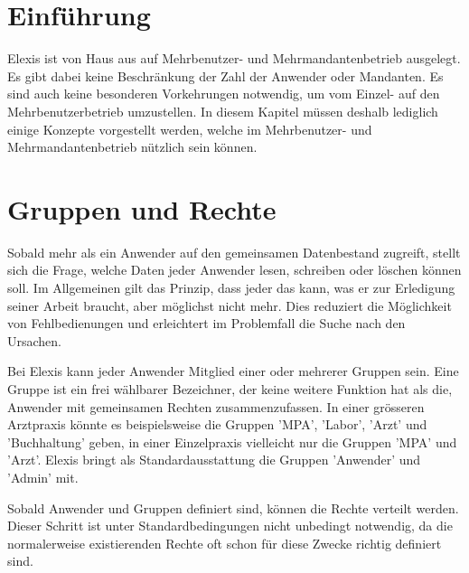 
\section{Einführung}
Elexis ist von Haus aus auf Mehrbenutzer- und Mehrmandantenbetrieb ausgelegt.
Es gibt dabei keine Beschränkung der Zahl der Anwender oder Mandanten. Es sind
auch keine besonderen Vorkehrungen notwendig, um vom Einzel- auf den
Mehrbenutzerbetrieb umzustellen. In diesem Kapitel müssen deshalb lediglich
einige Konzepte vorgestellt werden, welche im Mehrbenutzer- und
Mehrmandantenbetrieb nützlich sein können.

\section{Gruppen und Rechte}
\label{sec:gruppen}
Sobald mehr als ein Anwender auf den gemeinsamen Datenbestand zugreift, stellt
sich die Frage, welche Daten jeder Anwender lesen, schreiben oder löschen können
soll. Im Allgemeinen gilt das Prinzip, dass jeder das kann, was er
zur Erledigung seiner Arbeit braucht, aber möglichst nicht mehr. Dies reduziert
die Möglichkeit von Fehlbedienungen und erleichtert im Problemfall die Suche
nach den Ursachen.

Bei Elexis kann jeder Anwender Mitglied einer oder mehrerer Gruppen sein. Eine
Gruppe ist ein frei wählbarer Bezeichner, der keine weitere Funktion hat als
die, Anwender mit gemeinsamen Rechten zusammenzufassen. In einer grösseren
Arztpraxis könnte es beispielsweise die Gruppen 'MPA', 'Labor', 'Arzt' und
'Buchhaltung' geben, in einer Einzelpraxis vielleicht nur die Gruppen 'MPA' und
'Arzt'. Elexis bringt als Standardausstattung die Gruppen 'Anwender' und 'Admin'
mit.

Sobald Anwender und Gruppen definiert sind, können die Rechte verteilt werden.
Dieser Schritt ist unter Standardbedingungen nicht unbedingt notwendig, da die
normalerweise existierenden Rechte oft schon für diese Zwecke richtig definiert
sind.


